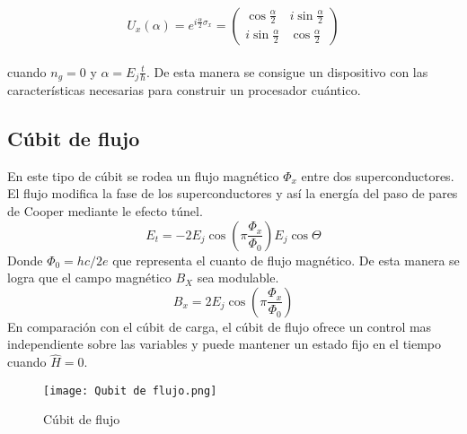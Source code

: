 \documentclass[12pt]{article}
\begin{document}
\begin{equation}\label{eq:2 rotation}
  U_x(\alpha )= e^{i\frac{\alpha }{2}\hat{\sigma_x}} = 
  \begin{pmatrix}
    \cos \frac{\alpha}{2}  & i\sin \frac{\alpha}{2} \\
    i\sin \frac{\alpha}{2} & \cos \frac{\alpha}{2}
  \end{pmatrix}
\end{equation}\\
cuando $n_g = 0$ y $\alpha = E_j \frac{t}{\hbar}$.
De esta manera se consigue un dispositivo con las características necesarias para construir un procesador cuántico.

\subsection{Cúbit de flujo}
En este tipo de cúbit se rodea un flujo magnético $\Phi_x$ entre dos superconductores. El flujo modifica la fase de los superconductores y así la energía del paso de pares de Cooper mediante le efecto túnel.
\begin{equation}
  \label{Energia de tunelamiento}
  E_t = -2E_j\cos(\pi\frac{\Phi_x}{\Phi_0})E_j\cos\Theta
\end{equation}
Donde $\Phi_0 = hc/2e$ que representa el cuanto de flujo magnético. De esta manera se logra que el campo magnético $B_X$ sea modulable. 
\begin{equation}
  \label{Energia magnetica modulable}
  B_x = 2E_j\cos(\pi\frac{\Phi_x}{\Phi_0})
\end{equation}
En comparación con el cúbit de carga, el cúbit de flujo ofrece un control mas independiente sobre las variables y puede mantener un estado fijo en el tiempo cuando $\widehat{H} =0$.
\begin{figure}[ht]
  \centering
  \texttt{[image: Qubit de flujo.png]}
  \caption{Cúbit de flujo \cite{gu_microwave_2017}}
  \label{fig:Cúbit de flujo}
\end{figure}
\end{document}
